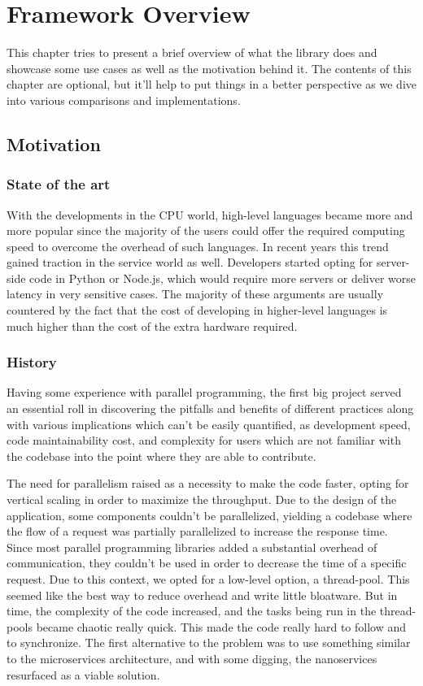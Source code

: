 \chapter{Framework Overview}

This chapter tries to present a brief overview of what the library does and showcase some use cases as well as the motivation behind it. The contents of this chapter are optional, but it'll help to put things in a better perspective as we dive into various comparisons and implementations.

\section{Motivation}

\subsection*{State of the art} With the developments in the CPU world, high-level languages became more and more popular since the majority of the users could offer the required computing speed to overcome the overhead of such languages. In recent years this trend gained traction in the service world as well. Developers started opting for server-side code in Python or Node.js, which would require more servers or deliver worse latency in very sensitive cases. The majority of these arguments are usually countered by the fact that the cost of developing in higher-level languages is much higher than the cost of the extra hardware required.

\subsection*{History} Having some experience with parallel programming, the first big project served an essential roll in discovering the pitfalls and benefits of different practices along with various implications which can't be easily quantified, as development speed, code maintainability cost, and complexity for users which are not familiar with the codebase into the point where they are able to contribute.

The need for parallelism raised as a necessity to make the code faster, opting for vertical scaling in order to maximize the throughput. Due to the design of the application, some components couldn't be parallelized, yielding a codebase where the flow of a request was partially parallelized to increase the response time. Since most parallel programming libraries added a substantial overhead of communication, they couldn't be used in order to decrease the time of a specific request. Due to this context, we opted for a low-level option, a thread-pool. This seemed like the best way to reduce overhead and write little bloatware. But in time, the complexity of the code increased, and the tasks being run in the thread-pools became chaotic really quick. This made the code really hard to follow and to synchronize. The first alternative to the problem was to use something similar to the microservices architecture, and with some digging, the nanoservices resurfaced as a viable solution.

